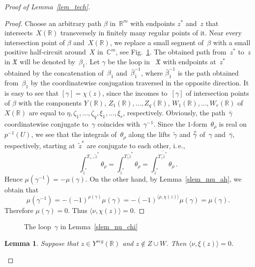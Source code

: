 \documentclass[reqno,tbtags,12pt]{amsart}
\numberwithin{equation}{section}
\newcommand{\R}{\mathbb{R}}
\newcommand{\C}{\mathbb{C}}
\newcommand{\FX}{\mathfrak{X}}
\newcommand{\tz}{\tilde{z}}
\newtheorem{lem}[theorem]{Lemma}
\theoremstyle{definition}
\begin{document}
\begin{proof}[Proof of Lemma~\ref{lem_tech}]
\begin{proof}
Choose an arbitrary path $\beta$ in~$\R^m$ with endpoints $z^*$ and~$z$ that intersects~$X(\R)$  transversely in finitely many regular points of it. Near every intersection point of $\beta$ and~$X(\R)$, we replace a small segment of~$\beta$ with a small positive half-circuit around~$X$ in~$\C^m$, see Fig.~\ref{fig_beta}. The obtained path from~$z^*$ to~$z$  in $\FX$ will be denoted by~$\beta_1$. Let $\gamma$ be the loop in~ $\FX$ with endpoints at~$z^*$ obtained by the concatenation of~$\beta_1$  and~$\bar\beta^{-1}_1$, where  $\bar\beta_1^{-1}$ is the path obtained from~$\beta_1$ by the coordinatewise conjugation traversed in the opposite direction. It is easy to see that $[\gamma]=\chi(z)$, since the incomes to~$[\gamma]$ of intersection points of $\beta$ with the components $Y(\R)$, $Z_1(\R),\ldots,Z_q(\R)$, $W_1(\R),\ldots,W_r(\R)$  of~$X(\R)$ are equal to $\eta,\zeta_1,\ldots,\zeta_q,\xi_1,\ldots,\xi_r$, respectively.
Obviously, the path~$\bar\gamma$ coordinatewise conjugate to~$\gamma$ coincides with~$\gamma^{-1}$.  Since the $1$-form~$\theta_{\rho}$ is real on~$p^{-1}(U)$, we see that the integrals of~$\theta_{\rho}$ along the lifts~$\tilde\gamma$ and $\Tilde{\bar\gamma}$ of~$\gamma$ and~$\bar\gamma$, respectively, starting at~$\tz^*$ are conjugate to each other, i.\,e.,
\begin{equation}\label{eq_conjugate}
\int_{\tz^*}^{T_{\gamma^{-1}}\tz^*}\theta_{\rho}=\int_{\tz^*}^{T_{\bar\gamma}\tz^*}\theta_{\rho}=\overline{\int_{\tz^*}^{T_{\gamma}\tz^*}\theta_{\rho}\,}. 
\end{equation}
Hence $\mu(\gamma^{-1})=-\mu(\gamma)$. On the other hand, by Lemma~\ref{slem_mu_ah}, we obtain that $$\mu(\gamma^{-1})=-(-1)^{\rho(\gamma)}\mu(\gamma)=-(-1)^{\langle\rho,\chi(z)\rangle}\mu(\gamma)=\mu(\gamma).$$ Therefore $\mu(\gamma)=0$. Thus $\langle\nu,\chi(z)\rangle=0$.
\end{proof}

\begin{figure}
\begin{center}

\end{center}
\caption{The loop~$\gamma$ in Lemma~\ref{slem_nu_chi}}\label{fig_beta}
\end{figure}

\begin{lem}\label{cor_nu_xi}
Suppose that $z\in Y^{reg}(\R)$ and $z\notin Z\cup W$. Then $\langle\nu,\xi(z)\rangle=0$.
\end{lem}


\end{proof}
\end{document}
